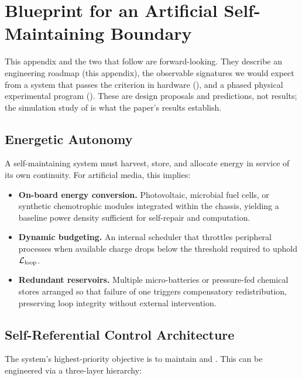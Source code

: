 \documentclass[11pt]{article}
\begin{document}
\section{Blueprint for an Artificial Self-Maintaining Boundary}
\label{sec:blueprint}

This appendix and the two that follow are forward-looking. They describe an engineering roadmap (this appendix), the observable signatures we would expect from a system that passes the criterion in hardware (), and a phased physical experimental program (). These are design proposals and predictions, not results; the simulation study of  is what the paper's results establish.

\subsection{Energetic Autonomy}
\label{sec:energetic_autonomy}

A self-maintaining system must harvest, store, and allocate energy in service of its own continuity. For artificial media, this implies:

\begin{itemize}
\item \textbf{On-board energy conversion.} Photovoltaic, microbial fuel cells, or synthetic chemotrophic modules integrated within the chassis, yielding a baseline power density sufficient for self-repair and computation.
\item \textbf{Dynamic budgeting.} An internal scheduler that throttles peripheral processes when available charge drops below the threshold required to uphold $\mathcal{L}_{\text{loop}}$.
\item \textbf{Redundant reservoirs.} Multiple micro-batteries or pressure-fed chemical stores arranged so that failure of one triggers compensatory redistribution, preserving loop integrity without external intervention.
\end{itemize}

\subsection{Self-Referential Control Architecture}
\label{sec:self_ref_arch}

The system's highest-priority objective is to maintain \NC and \SC. This can be engineered via a three-layer hierarchy:
\end{document}
